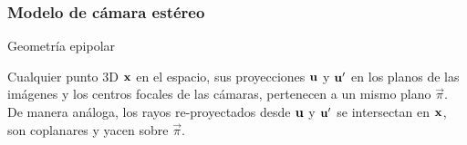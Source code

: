 \documentclass[compress]{beamer}
\begin{document}
\begin{frame}
\frametitle{Modelo de cámara estéreo}

\begin{block}{Geometría epipolar}



Cualquier punto 3D $\boldsymbol{\mathbf{x}}$ en el espacio, sus proyecciones $\boldsymbol{\mathbf{u}}$ y $\boldsymbol{\mathbf{u}}^{\prime}$ en los planos de las imágenes y los centros focales de las cámaras, pertenecen a un mismo plano $\vec{\pi}$.
De manera análoga, los rayos re-proyectados desde $\boldsymbol{\mathbf{u}}$ y $\boldsymbol{\mathbf{u}}^{\prime}$ se intersectan en $\boldsymbol{\mathbf{x}}$, son coplanares y yacen sobre $\vec{\pi}$.
\end{block}

\begin{figure}[!htb]
	\centering
	\hfill
	\centering
	\hfill
\end{figure}
\end{frame}
\end{document}
